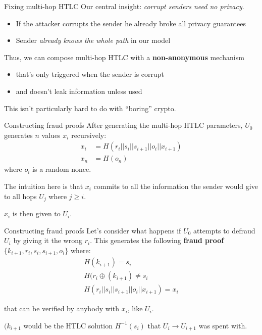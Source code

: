 \documentclass[aspectratio=169]{beamer}
\begin{document}
\begin{frame}{Fixing multi-hop HTLC}
    Our central insight: \emph{corrupt senders need no privacy}.
    \begin{itemize}
        \item If the attacker corrupts the sender he already broke all privacy guarantees
        \item Sender \emph{already knows the whole path} in our model
    \end{itemize}

    Thus, we can compose multi-hop HTLC with a \textbf{non-anonymous} mechanism
    \begin{itemize}
        \item that's only triggered when the sender is corrupt
        \item and doesn't leak information unless used
    \end{itemize}

    This isn't particularly hard to do with ``boring'' crypto.
\end{frame}

\begin{frame}{Constructing fraud proofs}
    After generating the multi-hop HTLC parameters, $U_0$ generates $n$ values $x_i$ recursively:
    \begin{align*}
        x_i & = H(r_i||s_i||s_{i+1}||o_i||x_{i+1}) \\
        x_n & = H(o_n)
    \end{align*}
    where $o_i$ is a random nonce.

    The intuition here is that $x_i$ commits to all the information the sender would give to all hops $U_j$ where $j\geq i$.

    $x_i$ is then given to $U_i$.
\end{frame}

\begin{frame}{Constructing fraud proofs}
    Let's consider what happens if $U_0$ attempts to defraud $U_i$ by giving it the wrong $r_i$. This generates the following \textbf{fraud proof} $\{k_{i+1}, r_i, s_i, s_{i+1}, o_i \}$ where:
    \begin{gather*}
        H(k_{i+1}) = s_i \\
        H(r_i\oplus(k_{i+1}) \neq s_i\\
        H(r_i||s_i||s_{i+1}||o_i||x_{i+1})=x_i
    \end{gather*}

    that can be verified by anybody with $x_i$, like $U_i$.

    $(k_{i+1}$ would be the HTLC solution $H^{-1}(s_i)$ that $U_i \rightarrow U_{i+1}$ was spent with.
\end{frame}
\end{document}
